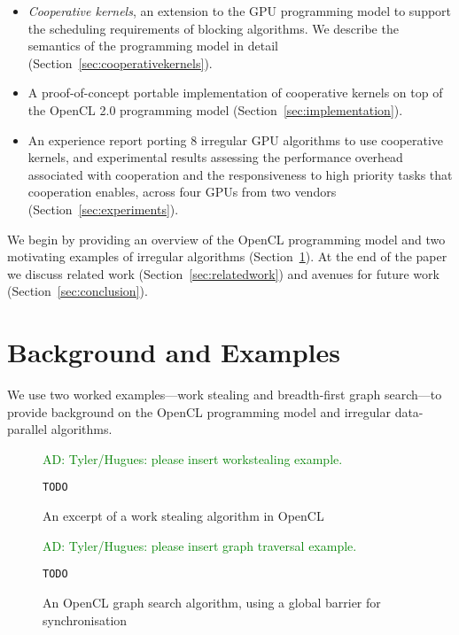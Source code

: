 \documentclass[nocopyrightspace]{sigplanconf-pldi16}
\newcommand{\ADComment}[1]{\textcolor{green}{AD: #1}}
\newcommand{\NumAlgorithms}{8}
\begin{document}
\begin{itemize}

\item \emph{Cooperative kernels}, an extension to the GPU programming model to support the scheduling requirements of blocking algorithms.  We describe the semantics of the programming model in detail (Section~\ref{sec:cooperativekernels}). 

\item A proof-of-concept portable implementation of cooperative
  kernels on top of the OpenCL 2.0 programming model
  (Section~\ref{sec:implementation}).

\item An experience report porting \NumAlgorithms{} irregular GPU
  algorithms to use cooperative kernels, and experimental results
  assessing the performance overhead associated with cooperation and
  the responsiveness to high priority tasks that cooperation enables,
  across four GPUs from two vendors (Section~\ref{sec:experiments}).

\end{itemize}

We begin by providing an overview of the OpenCL programming model and
two motivating examples of irregular algorithms (Section~\ref{sec:background}).  At the end of the paper we discuss related work (Section~\ref{sec:relatedwork}) and avenues for future work (Section~\ref{sec:conclusion}).

\section{Background and Examples}\label{sec:background}

We use two worked examples---work stealing and breadth-first graph
search---to provide background on the OpenCL programming model and
irregular data-parallel algorithms.

\begin{figure}
\ADComment{Tyler/Hugues: please insert workstealing example.}
\begin{lstlisting}
TODO
\end{lstlisting}
\caption{An excerpt of a work stealing algorithm in OpenCL}\label{fig:workstealing}
\end{figure}

\begin{figure}
\ADComment{Tyler/Hugues: please insert graph traversal example.}
\begin{lstlisting}
TODO
\end{lstlisting}
\caption{An OpenCL graph search algorithm, using a global barrier for synchronisation}\label{fig:graphsearch}
\end{figure}
\end{document}
